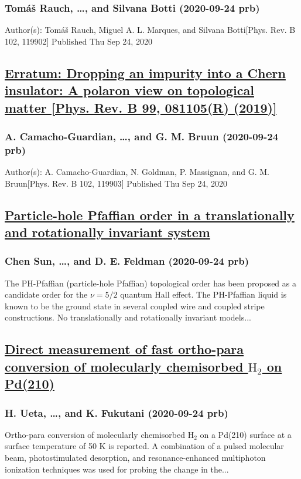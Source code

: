 \subsubsection*{Tomáš Rauch, \dots, and Silvana Botti (2020-09-24 prb)}
Author(s): Tomáš Rauch, Miguel A. L. Marques, and Silvana Botti[Phys. Rev. B 102, 119902] Published Thu Sep 24, 2020
\subsection*{\href{http://link.aps.org/doi/10.1103/PhysRevB.102.119903}{Erratum: Dropping an impurity into a Chern insulator: A polaron view on topological matter [Phys. Rev. B 99, 081105(R) (2019)]}}
\subsubsection*{A. Camacho-Guardian, \dots, and G. M. Bruun (2020-09-24 prb)}
Author(s): A. Camacho-Guardian, N. Goldman, P. Massignan, and G. M. Bruun[Phys. Rev. B 102, 119903] Published Thu Sep 24, 2020
\subsection*{\href{http://link.aps.org/doi/10.1103/PhysRevB.102.121303}{Particle-hole Pfaffian order in a translationally and rotationally invariant system}}
\subsubsection*{Chen Sun, \dots, and D. E. Feldman (2020-09-24 prb)}
The PH-Pfaffian (particle-hole Pfaffian) topological order has been proposed as a candidate order for the $ν=5/2$ quantum Hall effect. The PH-Pfaffian liquid is known to be the ground state in several coupled wire and coupled stripe constructions. No translationally and rotationally invariant models...
\subsection*{\href{http://link.aps.org/doi/10.1103/PhysRevB.102.121407}{Direct measurement of fast ortho-para conversion of molecularly chemisorbed ${\mathrm{H}}_{2}$ on Pd(210)}}
\subsubsection*{H. Ueta, \dots, and K. Fukutani (2020-09-24 prb)}
Ortho-para conversion of molecularly chemisorbed ${\mathrm{H}}_{2}$ on a Pd(210) surface at a surface temperature of 50 K is reported. A combination of a pulsed molecular beam, photostimulated desorption, and resonance-enhanced multiphoton ionization techniques was used for probing the change in the...
